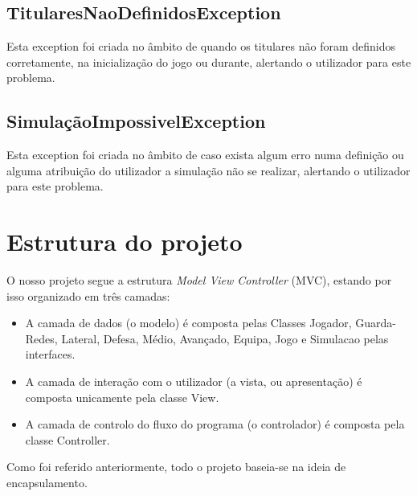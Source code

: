 \documentclass[a4paper]{report}
\begin{document}
	\section{TitularesNaoDefinidosException}
	
	Esta exception foi criada no âmbito de quando os titulares não foram definidos corretamente, na inicialização do jogo ou durante, alertando o utilizador para este problema.
	
	\section{SimulaçãoImpossivelException}
	
	Esta exception foi criada no âmbito de caso exista algum erro numa definição ou alguma atribuição do utilizador a simulação não se realizar, alertando o utilizador para este problema.
	
	
	

	\chapter{Estrutura do projeto}

	O nosso projeto segue a estrutura \textit{Model View Controller} (MVC), estando por isso organizado em três camadas:
	\begin{itemize}
		\item A camada de dados (o modelo) é composta pelas Classes Jogador, Guarda-Redes, Lateral, Defesa, Médio, Avançado, Equipa, Jogo e Simulacao pelas interfaces.
		\item A camada de interação com o utilizador (a vista, ou apresentação) é composta unicamente pela classe View.
		\item A camada de controlo do fluxo do programa (o controlador) é composta pela classe Controller.
	\end{itemize}
      Como foi referido anteriormente, todo o projeto baseia-se na ideia de encapsulamento.
      

      

	
\end{document}
